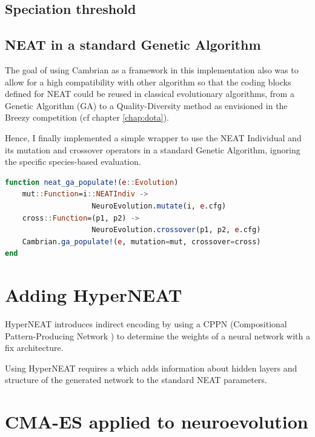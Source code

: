 \subsection{Speciation threshold}

\subsection{NEAT in a standard Genetic Algorithm}

The goal of using Cambrian as a framework in this implementation also was to allow for a high compatibility with other algorithm so that the coding blocks defined for NEAT could be reused in classical evolutionary algorithms, from a Genetic Algorithm (GA) to a Quality-Diversity method as envisioned in the Breezy competition (cf chapter \ref{chap:dota}). 

Hence, I finally implemented a simple wrapper to use the NEAT Individual and its mutation and crossover operators in a standard Genetic Algorithm, ignoring the specific species-based evaluation.

\begin{lstlisting}[language=Julia, caption=NEAT in a Genetic Algorithm (\href{https://github.com/TemplierPaul/NeuroEvolution.jl/blob/master/src/evolution.jl}{\color{blue}{Source}})]
function neat_ga_populate!(e::Evolution)
    mut::Function=i::NEATIndiv -> 
                    NeuroEvolution.mutate(i, e.cfg)
    cross::Function=(p1, p2) -> 
                    NeuroEvolution.crossover(p1, p2, e.cfg)
    Cambrian.ga_populate!(e, mutation=mut, crossover=cross)
end
\end{lstlisting}

\section{Adding HyperNEAT}
HyperNEAT \cite{HyperNEAT} introduces indirect encoding by using a CPPN (Compositional Pattern-Producing Network \cite{CPPN}) to determine the weights of a neural network with a fix architecture. 

Using HyperNEAT requires a \href{https://github.com/TemplierPaul/NeuroEvolution.jl/blob/master/cfg/hyperneat.yaml}{\color{blue}{specific YAML file}} which adds information about hidden layers and structure of the generated network to the standard NEAT parameters. 


\section{CMA-ES applied to neuroevolution}

